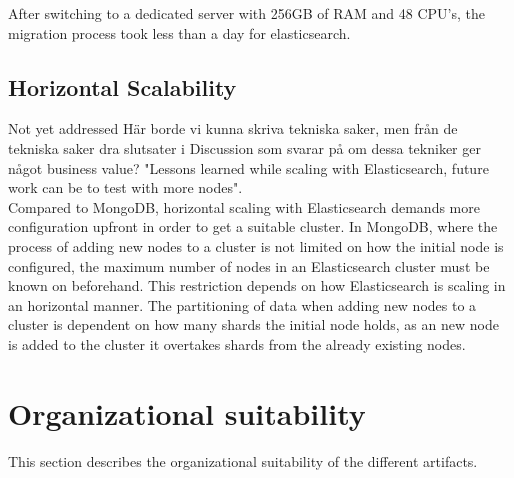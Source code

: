 After switching to a dedicated server with 256GB of RAM and 48 CPU's, the migration process took less than a day for elasticsearch.

\subsection{Horizontal Scalability}
Not yet addressed
Här borde vi kunna skriva tekniska saker, men från de tekniska saker dra slutsater i Discussion som svarar på om dessa tekniker ger något business value?
"Lessons learned while scaling with Elasticsearch, future work can be to test with more nodes".\\
Compared to MongoDB, horizontal scaling with Elasticsearch demands more configuration upfront in order to get a suitable cluster. 
In MongoDB, where the process of adding new nodes to a cluster is not limited on how the initial node is configured, the maximum number of nodes in an Elasticsearch cluster must be known on beforehand. This restriction depends on how Elasticsearch is scaling in an horizontal manner. The partitioning of data when adding new nodes to a cluster is dependent on how many shards the initial node holds, as an new node is added to the cluster it overtakes shards from the already existing nodes.

\section{Organizational suitability}
This section describes the organizational suitability of the different artifacts.
